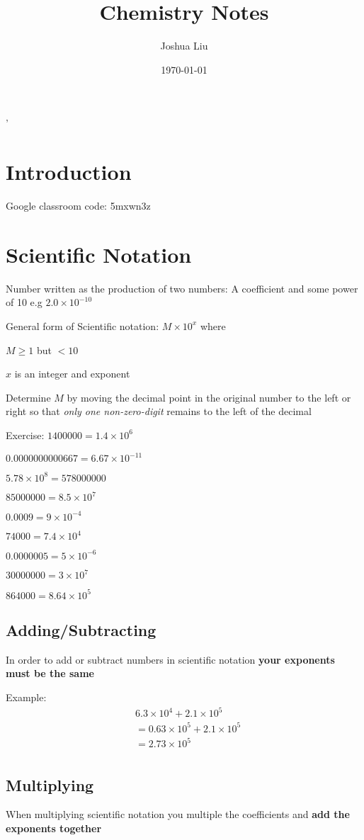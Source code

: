 \documentclass[12pt]{article}
\title{Chemistry Notes}
\author{Joshua Liu}
\date{\today}
\newcommand{\sn}[2]{#1\times10^{#2}}
\begin{document}
\maketitle
\tableofcontents'
\newpage
\section{Introduction}
Google classroom code: 5mxwn3z

\section{Scientific Notation}
Number written as the production of two numbers:
A coefficient and some power of 10
e.g $2.0\times10^{-10}$

General form of Scientific notation: $M\times10^x$ where

$M \ge 1$ but $<10$

$x$ is an integer and exponent

Determine $M$ by moving the decimal point in the original number to the left or right so that \emph{only one non-zero-digit} remains to the left of the decimal

Exercise: $1400000=\sn{1.4}{6}$

$0.000 000 000 066 7=6.67\times10^{-11}$

$5.78\times10^8=578000000$

$85000000=8.5\times10^{7}$

$0.0009=\sn{9}{-4}$

$74000=\sn{7.4}{4}$

$0.0000005=\sn{5}{-6}$

$30000000=\sn{3}{7}$

$864000=\sn{8.64}{5}$
\subsection{Adding/Subtracting}
In order to add or subtract numbers in scientific notation \textbf{your exponents must be the same}

Example: 
\begin{align*}
    &\sn{6.3}{4}+\sn{2.1}{5}\\
    &=\sn{0.63}{5}+\sn{2.1}{5}\\
    &=\sn{2.73}{5}\\
\end{align*}
\subsection{Multiplying}
When multiplying scientific notation you multiple the coefficients and \textbf{add the exponents together}
\end{document}
